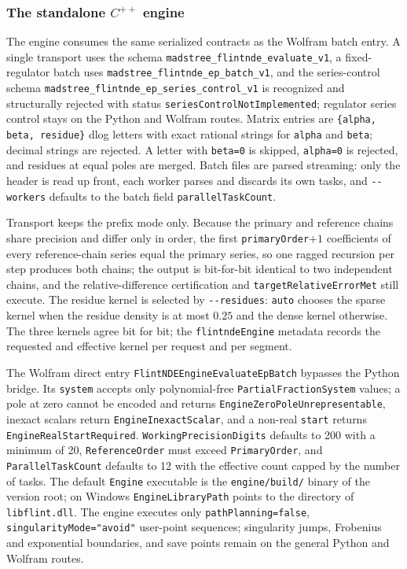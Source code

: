 \documentclass[11pt]{article}
\begin{document}
\subsubsection{The standalone \texorpdfstring{$C^{++}$}{C++} engine}
\label{subsec:engine}

The engine consumes the same serialized contracts as the Wolfram batch entry.  A single
transport uses the schema \texttt{madstree\_flintnde\_evaluate\_v1}, a fixed-regulator batch
uses \texttt{madstree\_flintnde\_ep\_batch\_v1}, and the series-control schema
\texttt{madstree\_flintnde\_ep\_series\_control\_v1} is recognized and structurally rejected
with status \texttt{seriesControlNotImplemented}; regulator series control stays on the
Python and Wolfram routes.  Matrix entries are \texttt{\{alpha, beta, residue\}} dlog letters
with exact rational strings for \texttt{alpha} and \texttt{beta}; decimal strings are
rejected.  A letter with \texttt{beta=0} is skipped, \texttt{alpha=0} is rejected, and
residues at equal poles are merged.  Batch files are parsed streaming: only the header is
read up front, each worker parses and discards its own tasks, and \texttt{-{}-workers}
defaults to the batch field \texttt{parallelTaskCount}.

Transport keeps the prefix mode only.  Because the primary and reference chains share
precision and differ only in order, the first \texttt{primaryOrder}$+1$ coefficients of every
reference-chain series equal the primary series, so one ragged recursion per step produces
both chains; the output is bit-for-bit identical to two independent chains, and the
relative-difference certification and \texttt{targetRelativeErrorMet} still execute.  The
residue kernel is selected by \texttt{-{}-residues}: \texttt{auto} chooses the sparse kernel
when the residue density is at most $0.25$ and the dense kernel otherwise.  The three
kernels agree bit for bit; the \texttt{flintndeEngine} metadata records the requested and
effective kernel per request and per segment.

The Wolfram direct entry
\texttt{FlintNDE}\allowbreak\texttt{Engine}\allowbreak\texttt{Evaluate}\allowbreak\texttt{EpBatch}
bypasses the Python bridge.  Its \texttt{system} accepts only polynomial-free
\texttt{PartialFractionSystem} values; a pole at zero cannot be encoded and returns
\texttt{EngineZeroPoleUnrepresentable}, inexact scalars return \texttt{EngineInexactScalar},
and a non-real \texttt{start} returns \texttt{EngineRealStartRequired}.
\texttt{WorkingPrecisionDigits} defaults to 200 with a minimum of 20,
\texttt{ReferenceOrder} must exceed \texttt{PrimaryOrder}, and \texttt{ParallelTaskCount}
defaults to 12 with the effective count capped by the number of tasks.  The default
\texttt{Engine} executable is the \texttt{engine/build/} binary of the version root; on
Windows \texttt{EngineLibraryPath} points to the directory of \texttt{libflint.dll}.  The
engine executes only \texttt{pathPlanning=false}, \texttt{singularityMode="avoid"}
user-point sequences; singularity jumps, Frobenius and exponential boundaries, and save
points remain on the general Python and Wolfram routes.
\end{document}
